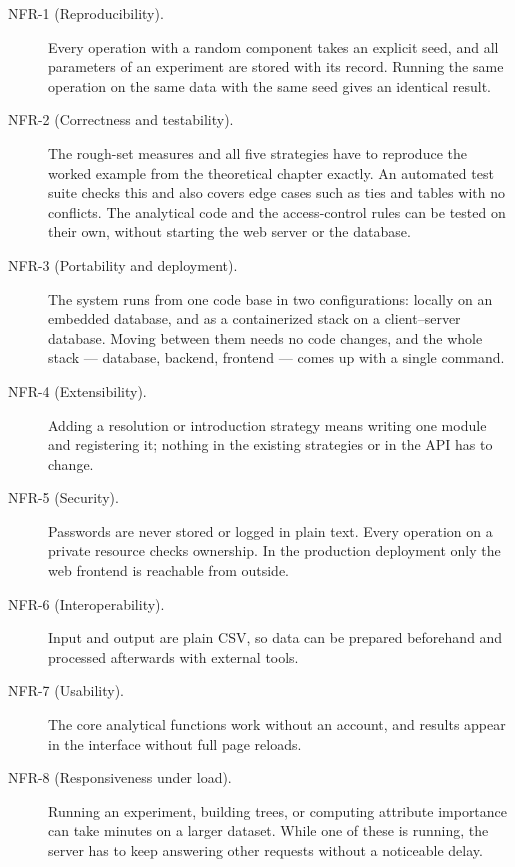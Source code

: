 \begin{description}

\item[NFR-1 (Reproducibility).]
Every operation with a random component takes an explicit seed, and all parameters of an experiment are stored with its record. Running the same operation on the same data with the same seed gives an identical result.

\item[NFR-2 (Correctness and testability).]
The rough-set measures and all five strategies have to reproduce the worked example from the theoretical chapter exactly. An automated test suite checks this and also covers edge cases such as ties and tables with no conflicts. The analytical code and the access-control rules can be tested on their own, without starting the web server or the database.

\item[NFR-3 (Portability and deployment).]
The system runs from one code base in two configurations: locally on an embedded database, and as a containerized stack on a client--server database. Moving between them needs no code changes, and the whole stack --- database, backend, frontend --- comes up with a single command.

\item[NFR-4 (Extensibility).]
Adding a resolution or introduction strategy means writing one module and registering it; nothing in the existing strategies or in the API has to change.

\item[NFR-5 (Security).]
Passwords are never stored or logged in plain text. Every operation on a private resource checks ownership. In the production deployment only the web frontend is reachable from outside.

\item[NFR-6 (Interoperability).]
Input and output are plain CSV, so data can be prepared beforehand and processed afterwards with external tools.

\item[NFR-7 (Usability).]
The core analytical functions work without an account, and results appear in the interface without full page reloads.

\item[NFR-8 (Responsiveness under load).]
Running an experiment, building trees, or computing attribute importance can take minutes on a larger dataset. While one of these is running, the server has to keep answering other requests without a noticeable delay.

\end{description}

